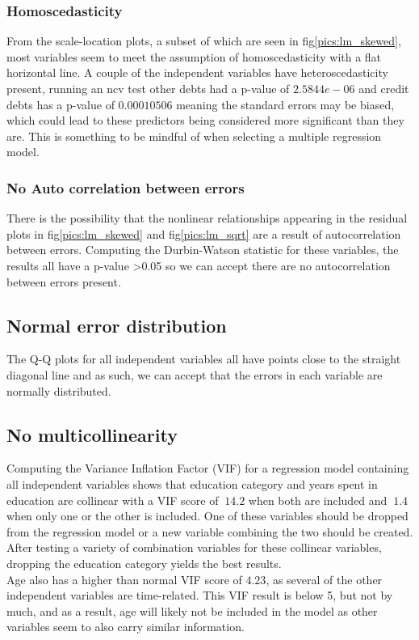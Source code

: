 \documentclass[journal]{IEEEtran}
\begin{document}
\subsubsection{Homoscedasticity}
From the scale-location plots, a subset of which are seen in  fig\ref{pics:lm_skewed}, most variables seem to meet the assumption of homoscedasticity with a flat horizontal line. A couple of the independent variables have heteroscedasticity present, running an ncv test other debts had a p-value of $2.5844e-06$ and credit debts has a p-value of $0.00010506$ meaning the standard errors may be biased, which could lead to these predictors being considered more significant than they are. This is something to be mindful of when selecting a multiple regression model.
\subsubsection{No Auto correlation between errors}
\indent
There is the possibility that the nonlinear relationships appearing in the residual plots in fig\ref{pics:lm_skewed} and fig\ref{pics:lm_sqrt} are a result of autocorrelation between errors. Computing the Durbin-Watson statistic\cite{durbin_watson} for these variables, the results all have a p-value >0.05 so we can accept there are no autocorrelation between errors present.  


\subsection{Normal error distribution}
The Q-Q plots for all independent variables all have points close to the straight diagonal line and as such, we can accept that the errors in each variable are normally distributed.\cite{intro_to_stat_and_data_analysis_model_assumptions} 
\subsection{No multicollinearity}
Computing the Variance Inflation Factor (VIF)\cite{vif} for a regression model containing all independent variables shows that education category and years spent in education are collinear with a VIF score of $~14.2$ when both are included and $~1.4$ when only one or the other is included. One of these variables should be dropped from the regression model or a new variable combining the two should be created. After testing a variety of combination variables for these collinear variables, dropping the education category yields the best results.
\\
\indent
Age also has a higher than normal VIF score of $4.23$, as several of the other independent variables are time-related. This VIF result is below 5, but not by much, and as a result, age will likely not be included in the model as other variables seem to also carry similar information.
\end{document}
